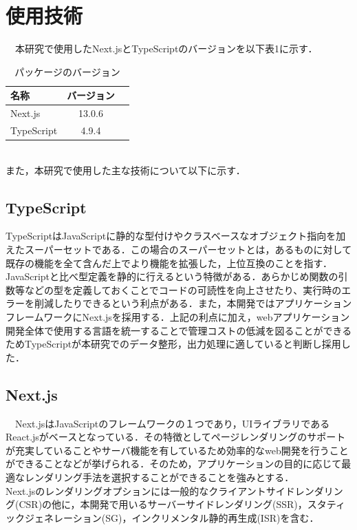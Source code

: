 \section{使用技術}
　本研究で使用したNext.jsとTypeScriptのバージョンを以下表1に示す．\\
 \begin{table}[ht]
   \centering
   \caption{パッケージのバージョン}
   \begin{tabular}{lcr}
      \hline
		名称         & バージョン   \\
		\hline \hline
		Next.js    & 13.0.6  \\
		TypeScript & 4.9.4   \\
		
		\hline
   \end{tabular}
 \end{table}\\
 また，本研究で使用した主な技術について以下に示す．
 \subsection{TypeScript}
 TypeScriptはJavaScriptに静的な型付けやクラスベースなオブジェクト指向を加えたスーパーセットである．この場合のスーパーセットとは，あるものに対して既存の機能を全て含んだ上でより機能を拡張した，上位互換のことを指す．JavaScriptと比べ型定義を静的に行えるという特徴がある．あらかじめ関数の引数等などの型を定義しておくことでコードの可読性を向上させたり、実行時のエラーを削減したりできるという利点がある．また，本開発ではアプリケーションフレームワークにNext.jsを採用する．上記の利点に加え，webアプリケーション開発全体で使用する言語を統一することで管理コストの低減を図ることができるためTypeScriptが本研究でのデータ整形，出力処理に適していると判断し採用した．

\subsection{Next.js}
　Next.jsはJavaScriptのフレームワークの１つであり，UIライブラリであるReact.jsがベースとなっている．その特徴としてページレンダリングのサポートが充実していることやサーバ機能を有しているため効率的なweb開発を行うことができることなどが挙げられる．そのため，アプリケーションの目的に応じて最適なレンダリング手法を選択することができることを強みとする．\\
 Next.jsのレンダリングオプションには一般的なクライアントサイドレンダリング(CSR)の他に，本開発で用いるサーバーサイドレンダリング(SSR)，スタティックジェネレーション(SG)，インクリメンタル静的再生成(ISR)を含む．

